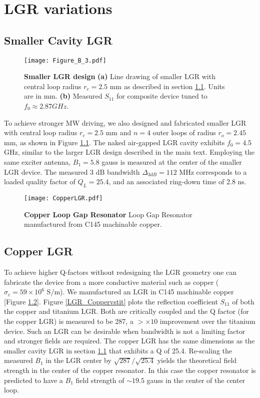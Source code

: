 \chapter{LGR variations} %

\section{Smaller Cavity LGR} \label{smallLGR}
\begin{figure}[b!]
\centering
\texttt{[image: Figure\_B\_3.pdf]}  
\caption{\textbf{Smaller LGR design} \textbf{(a)} Line drawing of smaller LGR with central loop radius $r_c = 2.5$ mm as described in section \ref{smallLGR}. Units are in mm. \textbf{(b)} Measured $S_{11}$ for composite device tuned to $f_0 \approx 2.87 GHz$.}
\label{smallLGRfigure}
\end{figure}   
To achieve stronger MW driving, we also designed and fabricated
smaller LGR with central loop radius $r_c = 2.5$ mm and $n = 4$ outer loops of radius $r_o = 2.45$ mm, as shown in Figure \ref{smallLGRfigure}. The naked air-gapped LGR cavity exhibits $f_0 = 4.5$ GHz, similar to the larger LGR design described in the main text. Employing the same exciter antenna, $B_1 = 5.8$ gauss is measured at the center of the smaller LGR device. The measured 3 dB bandwidth $\Delta_{3dB} = 112$ MHz corresponds to a loaded quality factor of $Q_L = 25.4$, and an associated ring-down time of 2.8 ns.


\begin{figure}[t!]
\centering
\texttt{[image: CopperLGR.pdf]}  
\caption{\textbf{Copper Loop Gap Resonator} Loop Gap Resonator manufactured from C145 machinable copper.}
\label{LGR_Copper}
\end{figure}   


\section{Copper LGR} \label{CopperLGR}

To achieve higher Q-factors without redesigning the LGR geometry one can fabricate the device from a more conductive material such as copper ($\sigma_c = 59 \times 10^6$ S/m). We manufactured an LGR in C145 machinable copper [Figure \ref{LGR_Copper}]. Figure \ref{LGR_Coppervstit} plots the reflection coefficient $S_{11}$ of both the copper and titanium LGR. Both are critically coupled and the Q factor (for the copper LGR) is measured to be 287, a $>\times 10$ improvement over the titanium device. Such an LGR can be desirable when bandwidth is not a limiting factor and stronger fields are required. The copper LGR has the same dimensions as the smaller cavity LGR in section \ref{smallLGR} that exhibits a Q of 25.4. Re-scaling the measured $B_1$ in the LGR center by $\sqrt{287}/\sqrt{25.4}$ yields the theoretical field strength in the center of the copper resonator. In this case the copper resonator is predicted to have a $B_1$ field strength of $\sim 19.5$ gauss in the center of the center loop.  

